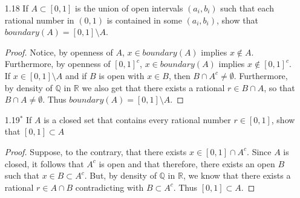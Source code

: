 \begin{enumerate}
    \begin{proof}
    Let \( A \) be the set of all points with rational coordinates in \( (0,1) \times (0,1) \). Then clearly \( boundary(A) \subset [0,1] \times [0,1] \). If \( x \in [0,1] \times [0,1] \) then \( x = (x_1, x_2) \) where \( 0 \leq x_1, x_2 \leq 1 \). Thus, if \( B \) is an open set containing \( x \), it follows that there exist \( 0 \leq \epsilon_1, \epsilon_2 \) such that \( [x_1-\epsilon_1, x_1+\epsilon_1] \times [x_2-\epsilon_2, x_2+\epsilon_2] \subset B \cap [0,1] \times [0,1] \). Density of \( \mathbb{Q} \) in \( \mathbb{R} \) and the existence of an irrational between any two reals implies that \( [0,1] \times [0,1] \subset boundary(A) \). Thus \( boundary(A) = [0,1] \times [0,1] \).
    \end{proof}
    
    \item[1.18] If \( A \subset [0,1] \) is the union of open intervals \( (a_i,b_i) \) such that each rational number in \( (0,1) \) is contained in some \( (a_i,b_i) \), show that \( boundary(A) = [0,1] \setminus A \).
    
    \begin{proof}
    Notice, by openness of \( A \), \( x \in boundary(A) \) implies \( x \not\in A \). Furthermore, by openness of \( [0,1]^c \), \( x \in boundary (A) \) implies \( x \not\in [0,1]^c \). If \( x \in [0,1] \setminus A \) and if \( B \) is open with \( x \in B \), then \( B \cap A^c \neq \emptyset \). Furthermore, by density of \( \mathbb{Q} \) in \( \mathbb{R} \) we also get that there exists a rational \( r \in B \cap A \), so that \( B \cap A \neq \emptyset \). Thus \( boundary(A) = [0,1] \setminus A \). 
    \end{proof}
    
    \item[1.19\(^*\)] If \( A \) is a closed set that contains every rational number \( r \in [0,1] \), show that \( [0,1] \subset A \)
    
    \begin{proof}
    Suppose, to the contrary, that there exists \( x \in [0,1] \cap A^c \). Since \( A \) is closed, it follows that \( A^c \) is open and that therefore, there exists an open \( B \) such that \( x \in B \subset A^c \). But, by density of \( \mathbb{Q} \) in \( \mathbb{R} \), we know that there exists a rational \( r \in A \cap B \) contradicting with \( B \subset A^c \). Thus \( [0,1] \subset A \). 
    \end{proof}
    

\end{enumerate}
